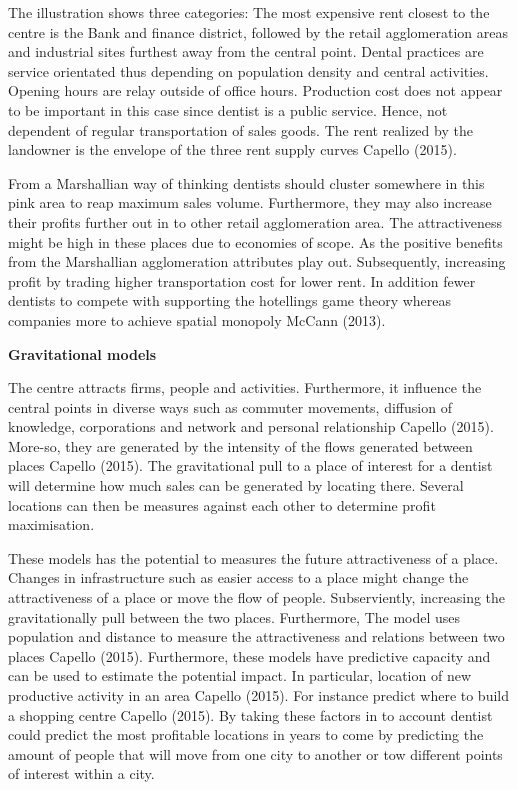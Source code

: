 \documentclass[
  10,
  a4paper,
]{article}
\begin{document}
The illustration shows three categories: The most expensive rent closest
to the centre is the Bank and finance district, followed by the retail
agglomeration areas and industrial sites furthest away from the central
point. Dental practices are service orientated thus depending on
population density and central activities. Opening hours are relay
outside of office hours. Production cost does not appear to be important
in this case since dentist is a public service. Hence, not dependent of
regular transportation of sales goods. The rent realized by the
landowner is the envelope of the three rent supply curves Capello
(2015).

From a Marshallian way of thinking dentists should cluster somewhere in
this pink area to reap maximum sales volume. Furthermore, they may also
increase their profits further out in to other retail agglomeration
area. The attractiveness might be high in these places due to economies
of scope. As the positive benefits from the Marshallian agglomeration
attributes play out. Subsequently, increasing profit by trading higher
transportation cost for lower rent. In addition fewer dentists to
compete with supporting the hotellings game theory whereas companies
more to achieve spatial monopoly McCann (2013).

\textbf{Gravitational models}

The centre attracts firms, people and activities. Furthermore, it
influence the central points in diverse ways such as commuter movements,
diffusion of knowledge, corporations and network and personal
relationship Capello (2015). More-so, they are generated by the
intensity of the flows generated between places Capello (2015). The
gravitational pull to a place of interest for a dentist will determine
how much sales can be generated by locating there. Several locations can
then be measures against each other to determine profit maximisation.

These models has the potential to measures the future attractiveness of
a place. Changes in infrastructure such as easier access to a place
might change the attractiveness of a place or move the flow of people.
Subserviently, increasing the gravitationally pull between the two
places. Furthermore, The model uses population and distance to measure
the attractiveness and relations between two places Capello (2015).
Furthermore, these models have predictive capacity and can be used to
estimate the potential impact. In particular, location of new productive
activity in an area Capello (2015). For instance predict where to build
a shopping centre Capello (2015). By taking these factors in to account
dentist could predict the most profitable locations in years to come by
predicting the amount of people that will move from one city to another
or tow different points of interest within a city.
\end{document}
